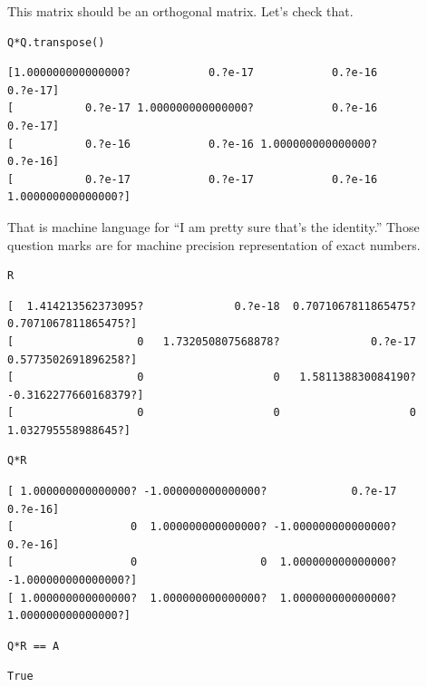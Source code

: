 \documentclass[10pt,]{book}
\theoremstyle{plain}
\theoremstyle{definition}
\numberwithin{equation}{section}
\begin{document}
      This matrix should be an orthogonal matrix. Let's check that.
\begin{lstlisting}[style=sageinput]
Q*Q.transpose()
\end{lstlisting}
\begin{lstlisting}[style=sageoutput]
[1.000000000000000?            0.?e-17            0.?e-16            0.?e-17]
[           0.?e-17 1.000000000000000?            0.?e-16            0.?e-17]
[           0.?e-16            0.?e-16 1.000000000000000?            0.?e-16]
[           0.?e-17            0.?e-17            0.?e-16 1.000000000000000?]
\end{lstlisting}
\par

      That is machine language for ``I am pretty sure that's the identity.''
      Those question marks are for machine precision representation of exact numbers.
\begin{lstlisting}[style=sageinput]
R
\end{lstlisting}
\begin{lstlisting}[style=sageoutput]
[  1.414213562373095?              0.?e-18  0.7071067811865475?  0.7071067811865475?]
[                   0   1.732050807568878?              0.?e-17  0.5773502691896258?]
[                   0                    0   1.581138830084190? -0.3162277660168379?]
[                   0                    0                    0   1.032795558988645?]
\end{lstlisting}
\begin{lstlisting}[style=sageinput]
Q*R
\end{lstlisting}
\begin{lstlisting}[style=sageoutput]
[ 1.000000000000000? -1.000000000000000?             0.?e-17             0.?e-16]
[                  0  1.000000000000000? -1.000000000000000?             0.?e-16]
[                  0                   0  1.000000000000000? -1.000000000000000?]
[ 1.000000000000000?  1.000000000000000?  1.000000000000000?  1.000000000000000?]
\end{lstlisting}
\begin{lstlisting}[style=sageinput]
Q*R == A
\end{lstlisting}
\begin{lstlisting}[style=sageoutput]
True
\end{lstlisting}
\typeout{************************************************}
\typeout{************************************************}
\end{document}
